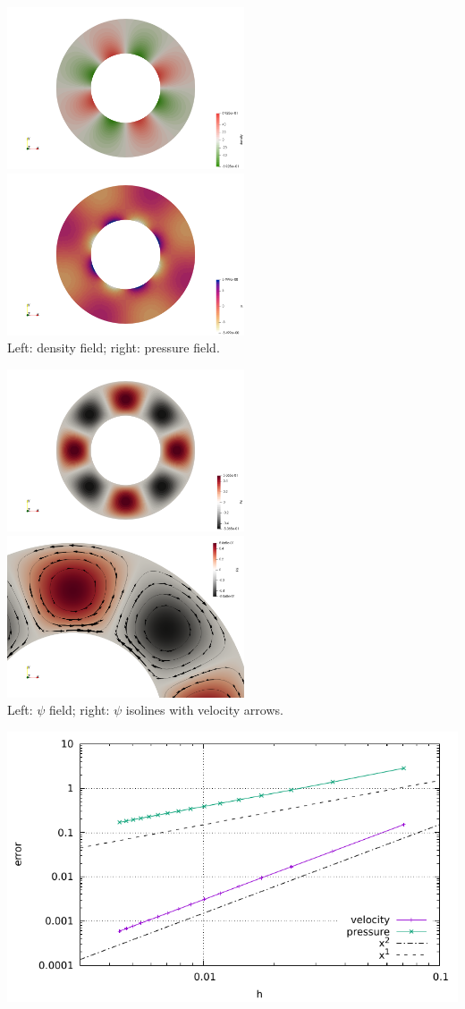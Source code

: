 \begin{center}
\includegraphics[width=7cm]{python_codes/fieldstone_09/density}
\includegraphics[width=7cm]{python_codes/fieldstone_09/pressure}\\
{\small Left: density field; right: pressure field.}
\end{center}

\begin{center}
\includegraphics[width=7cm]{python_codes/fieldstone_09/psi}
\includegraphics[width=7cm]{python_codes/fieldstone_09/psi_arrows}\\
{\small Left: $\psi$ field; right: $\psi$ isolines with velocity arrows.}
\end{center}

\includegraphics[width=15cm]{python_codes/fieldstone_09/errors}

